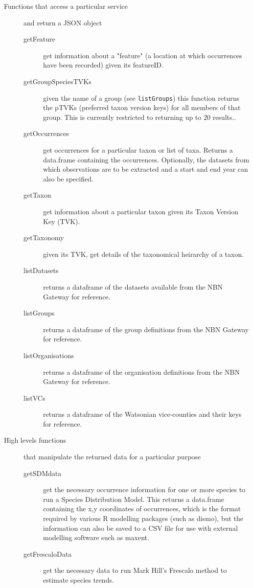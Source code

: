 \documentclass{article}
\begin{document}
\begin{description}
  \item[Functions that access a particular service] and return a JSON object
  \begin{description}
      \item[getFeature] get information about a "feature" (a location at which
      occurrences have been recorded) given its featureID.
      \item[getGroupSpeciesTVKs] given the name of a group (see \texttt{listGroups})
      this function returns the pTVKs (preferred taxon version keys) for all members
      of that group. This is currently restricted to returning up to 20 results..
      \item[getOccurrences] get occurrences for a particular taxon or list of
      taxa. Returns a data.frame containing the occurrences. Optionally, the
      datasets from which observations are to be extracted and a start and end
      year can also be specified.
      \item[getTaxon] get information about a particular taxon given its Taxon
      Version Key (TVK).
      \item[getTaxonomy] given its TVK, get details of the taxonomical heirarchy
      of a taxon.
      \item[listDatasets] returns a dataframe of the datasets available from the
      NBN Gateway for reference.
      \item[listGroups] returns a dataframe of the group definitions from the
      NBN Gateway for reference.
      \item[listOrganisations] returns a dataframe of the organisation definitions
      from the NBN Gateway for reference.
      \item[listVCs] returns a dataframe of the Watsonian vice-counties and their
      keys for reference.      
  \end{description}
  \item[High levels functions] that manipulate the returned data for
  a particular purpose
  \begin{description}
      \item[getSDMdata] get the necessary occurrence information for one or
      more species to run a Species Distribution Model. This returns a 
      data.frame containing the x,y coordinates of occurrences, which 
      is the format required by various R modelling packages (such as dismo),
      but the information can also be saved to a CSV file for use with external
      modelling software such as maxent.
      \item[getFrescaloData] get the necessary data to run Mark Hill's Frescalo
      method to estimate species trends.
  \end{description}
\end{description}
\end{document}
